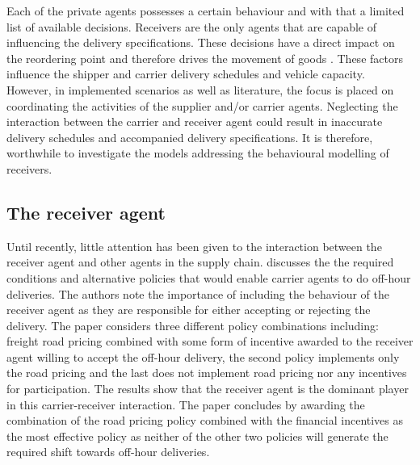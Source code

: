 Each of the private agents possesses a certain behaviour and with that a limited list of available decisions. Receivers are the only agents that are capable of influencing the delivery specifications. These decisions have a direct impact on the reordering point and therefore drives the movement of goods \citep{bean2018}. These factors influence the shipper and carrier delivery schedules and vehicle capacity. However, in implemented scenarios as well as literature, the focus is placed on coordinating the activities of the supplier and/or carrier agents. Neglecting the interaction between the carrier and receiver agent could result in inaccurate delivery schedules and accompanied delivery specifications. It is therefore, worthwhile to investigate the models addressing the behavioural modelling of receivers.\par 

\subsection{The receiver agent}

Until recently, little attention has been given to the interaction between the receiver agent and other agents in the supply chain. \citet{holguin2008necessary} discusses the the required conditions and alternative policies that would enable carrier agents to do off-hour deliveries. The authors note the importance of including the behaviour of the receiver agent as they are responsible for either accepting or rejecting the delivery. The paper considers three different policy combinations including: freight road pricing combined with some form of incentive awarded to the receiver agent willing to accept the off-hour delivery, the second policy implements only the road pricing and the last does not implement road pricing nor any incentives for participation. The results show that the receiver agent is the dominant player in this carrier-receiver interaction. The paper concludes by awarding the combination of the road pricing policy combined with the financial incentives as the most effective policy as neither of the other two policies will generate the required shift towards off-hour deliveries. \par

